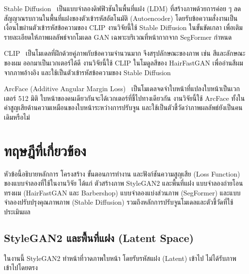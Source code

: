 Stable Diffusion~\cite{rombach2022highresolutionimagesynthesislatent} เป็นแบบจำลองดิฟฟิวชันในพื้นที่แฝง (LDM)
ที่สร้างภาพด้วยการค่อย ๆ ลดสัญญาณรบกวนในพื้นที่แฝงของตัวเข้ารหัสอัตโนมัติ (Autoencoder)
โดยรับข้อความสั่งงานเป็นเงื่อนไขผ่านตัวเข้ารหัสข้อความของ CLIP
งานวิจัยนี้ใช้ Stable Diffusion ในขั้นขัดเกลา เพื่อเติมรายละเอียดให้ภาพผลลัพธ์จากโมเดล GAN
เฉพาะบริเวณที่หน้ากากจาก SegFormer กำหนด

CLIP~\cite{radford2021learningtransferablevisualmodels} เป็นโมเดลที่ฝึกด้วยคู่ภาพกับข้อความจำนวนมาก
จึงสรุปลักษณะของภาพ เช่น สีและลักษณะของผม ออกมาเป็นเวกเตอร์ได้ดี
งานวิจัยนี้ใช้ CLIP ในโมดูลสีของ HairFastGAN เพื่ออ่านสีผมจากภาพอ้างอิง
และใช้เป็นตัวเข้ารหัสข้อความของ Stable Diffusion

ArcFace (Additive Angular Margin Loss)~\cite{Deng_2022}
เป็นโมเดลจดจำใบหน้าที่แปลงใบหน้าเป็นเวกเตอร์ 512 มิติ
ใบหน้าของคนเดียวกันจะได้เวกเตอร์ที่ชี้ไปทางเดียวกัน
งานวิจัยนี้ใช้ ArcFace ทั้งในค่าสูญเสียด้านความเหมือนของใบหน้าระหว่างการปรับจูน
และใช้เป็นตัวชี้วัดว่าภาพผลลัพธ์ยังเป็นคนเดิมหรือไม่
\section{ทฤษฎีที่เกี่ยวข้อง}

หัวข้อนี้อธิบายหลักการ โครงสร้าง ขั้นตอนการทำงาน และฟังก์ชันความสูญเสีย (Loss Function)
ของแบบจำลองที่ใช้ในงานวิจัย ได้แก่ ตัวสร้างภาพ StyleGAN2 และพื้นที่แฝง
แบบจำลองถ่ายโอนทรงผม (HairFastGAN และ Barbershop)
แบบจำลองแบ่งส่วนภาพ (SegFormer) และแบบจำลองปรับปรุงคุณภาพภาพ (Stable Diffusion)
รวมถึงหลักการปรับจูนโมเดลและตัวชี้วัดที่ใช้ประเมินผล

\subsection{StyleGAN2 และพื้นที่แฝง (Latent Space)}
\label{sec:stylegan2}
ในงานนี้ StyleGAN2 ทำหน้าที่วาดภาพใบหน้า โดยรับรหัสแฝง (Latent) เข้าไป ไม่ได้รับภาพเข้าไปโดยตรง

